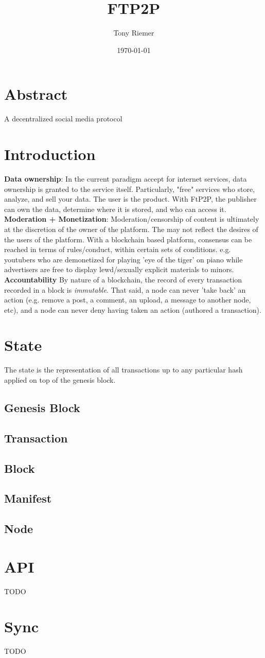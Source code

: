 \documentclass[12pt]{article}
\title{FTP2P}
\author{Tony Riemer}
\date{\today}
\begin{document}
\maketitle
\section{Abstract}
A decentralized social media protocol

\section{Introduction}
\textbf{Data ownership}: In the current paradigm accept for internet services, data ownership is granted to the service itself.
Particularly, "free" services who store, analyze, and sell your data. The user is the product. 
With FtP2P, the publisher can own the data, determine where it is stored, and who can access it.
\linebreak
\linebreak
\textbf{Moderation + Monetization}: Moderation/censorship of content is ultimately at the discretion of the owner of the platform.
The may not reflect the desires of the users of the platform.
With a blockchain based platform, consensus can be reached in terms of rules/conduct, within certain sets of conditions.
e.g. youtubers who are demonetized for playing 'eye of the tiger' on piano while advertisers are free to display lewd/sexually explicit materials to minors.
\linebreak
\linebreak
\textbf{Accountability}
By nature of a blockchain, the record of every transaction recorded in a block is \textit{immutable}. That said, a node can never 'take back' an action (e.g. remove a post, a comment, an upload, a message to another node, etc), and a node can never deny having taken an action (authored a transaction).

\section{State}
The state is the representation of all transactions up to any particular hash applied on top of the genesis block.
\subsection{Genesis Block}
\subsection{Transaction}
\subsection{Block}
\subsection{Manifest}
\subsection{Node}

\section{API}
TODO

\section{Sync}
TODO
\end{document}
